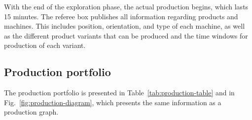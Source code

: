 \documentclass[12pt,twoside]{article}
\newcommand{\mytable}[1]{\savebox{\myt}{#1}\tikz\node[fill=gray!25!white]{\usebox{\myt}};}
\begin{document}
With the end of the exploration phase, the actual production begins,
which lasts \num{15} minutes. The referee box publishes all information
regarding products and machines. This includes position, orientation,
and type of each machine, as well as the different product variants
that can be produced and the time windows for production of each
variant. 


\subsection{Production portfolio}
\label{sec:prodportfolio}

The production portfolio is presented in
Table~\ref{tab:production-table} and in
Fig.~\ref{fig:production-diagram}, which presents the same information
as a production graph.







\end{document}
